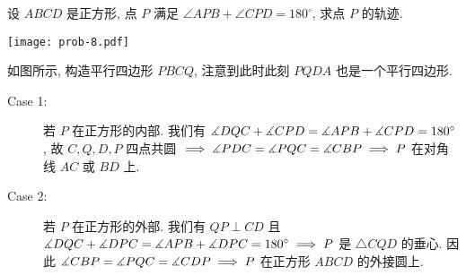 \begin{prob}
\label{prob:prob-8}
设 $ABCD$ 是正方形, 点 $P$ 满足 $\angle APB + \angle CPD = 180^\circ$,
求点 $P$ 的轨迹.
\end{prob}

\begin{center}
\texttt{[image: prob-8.pdf]}
\end{center}

\begin{soln}
如图所示, 构造平行四边形 $PBCQ$, 注意到此时此刻 $PQDA$ 也是一个平行四边形.
\begin{description}
\item[Case 1:] 若 $P$ 在正方形的内部.
我们有 $\measuredangle DQC + \measuredangle CPD = \measuredangle APB + \measuredangle CPD = 180^\circ$,
故 $C, Q, D, P$ 四点共圆 $\implies \measuredangle PDC = \measuredangle PQC
= \measuredangle CBP \implies P$ 在对角线 $AC$ 或 $BD$ 上.
\item[Case 2:] 若 $P$ 在正方形的外部.
我们有 $QP \perp CD$ 且 $\measuredangle DQC + \measuredangle DPC =
\measuredangle APB + \measuredangle DPC = 180^\circ \implies P$ 是 $\triangle CQD$ 的垂心.
因此 $\measuredangle CBP = \measuredangle PQC = \measuredangle CDP \implies P$
在正方形 $ABCD$ 的外接圆上.
\end{description}
\end{soln}

